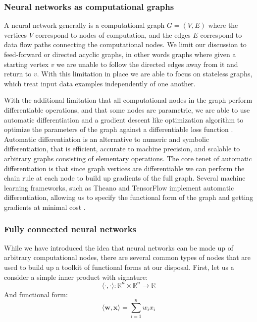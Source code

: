 \subsubsection{Neural networks as computational graphs}

A neural network generally is a computational graph $G = (V, E)$ where the
vertices $V$ correspond to nodes of computation, and the edges $E$ correspond
to data flow paths connecting the computational nodes. We limit our discussion
to feed-forward or directed acyclic graphs, in other words graphs where given
a starting vertex $v$ we are unable to follow the directed edges away from it
and return to $v$. With this limitation in place we are able to focus on
stateless graphs, which treat input data examples independently of one another.

With the additional limitation that all computational nodes in the graph
perform differentiable operations, and that some nodes are parametric, we are
able to use automatic differentiation and a gradient descent like optimization
algorithm to optimize the parameters of the graph against a differentiable
loss function \cite{DBLP:journals/corr/BaydinPR15}. Automatic differentiation
is an alternative to numeric and symbolic differentiation, that is efficient,
accurate to machine precision, and scalable to arbitrary graphs consisting of
elementary operations. The core tenet of automatic differentiation is that
since graph vertices are differentiable we can perform the chain rule at each
node to build up gradients of the full graph. Several machine learning
frameworks, such as Theano and TensorFlow implement automatic differentiation,
allowing us to specify the functional form of the graph and getting gradients
at minimal cost \cite{bergstra-proc-scipy-2010,DBLP:journals/corr/AbadiABBCCCDDDG16}.

\subsubsection{Fully connected neural networks}
\label{sec:nn}

While we have introduced the idea that neural networks can be made up of
arbitrary computational nodes, there are several common types of nodes that
are used to build up a toolkit of functional forms at our disposal. First, let
us a consider a simple inner product with signature:
\begin{equation}
\langle \cdot, \cdot \rangle \colon \mathbb{R}^n \times \mathbb{R}^n \to \mathbb{R}
\end{equation}
And functional form:
\begin{equation}
\langle \mathbf{w}, \mathbf{x} \rangle = \sum\limits_{i = 1}^n w_ix_i
\end{equation}

